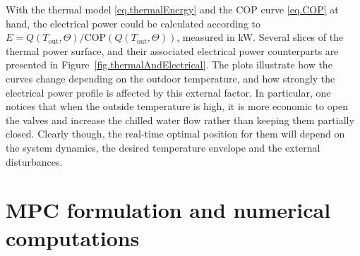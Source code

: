 With the thermal model \eqref{eq.thermalEnergy} and the COP curve \eqref{eq.COP} at hand, the electrical power could be calculated according to $E = Q(T_\text{out},\Theta)/\text{COP}(Q(T_\text{out},\Theta))$, measured in kW. Several slices of the thermal power surface, and their associated electrical power counterparts are presented in Figure~\ref{fig.thermalAndElectrical}. The plots illustrate how the curves change depending on the outdoor temperature, and how strongly the electrical power profile is affected by this external factor. In particular, one notices that when the outside temperature is high, it is more economic to open the valves and increase the chilled water flow rather than keeping them partially closed. Clearly though, the real-time optimal position for them will depend on the system dynamics, the desired temperature envelope and the external disturbances.

\section{MPC formulation and numerical computations}


